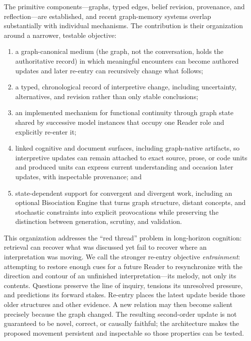 The primitive components---graphs, typed edges, belief revision, provenance, and reflection---are established, and recent graph-memory systems overlap substantially with individual mechanisms. The contribution is their organization around a narrower, testable objective:
\begin{enumerate}[leftmargin=*,nosep]
    \item a graph-canonical medium (the graph, not the conversation, holds the authoritative record) in which meaningful encounters can become authored updates and later re-entry can recursively change what follows;
    \item a typed, chronological record of interpretive change, including uncertainty, alternatives, and revision rather than only stable conclusions;
    \item an implemented mechanism for functional continuity through graph state shared by successive model instances that occupy one Reader role and explicitly re-enter it;
    \item linked cognitive and document surfaces, including graph-native artifacts, so interpretive updates can remain attached to exact source, prose, or code units and produced units can express current understanding and occasion later updates, with inspectable provenance; and
    \item state-dependent support for convergent and divergent work, including an optional Bisociation Engine that turns graph structure, distant concepts, and stochastic constraints into explicit provocations while preserving the distinction between generation, scrutiny, and validation.
\end{enumerate}

This organization addresses the ``red thread'' problem in long-horizon cognition: retrieval can recover what was discussed yet fail to recover where an interpretation was moving. We call the stronger re-entry objective \emph{entrainment}: attempting to restore enough cues for a future Reader to resynchronize with the direction and contour of an unfinished interpretation---its melody, not only its contents. Questions preserve the line of inquiry, tensions its unresolved pressure, and predictions its forward stakes. Re-entry places the latest update beside those older structures and other evidence. A new relation may then become salient precisely because the graph changed. The resulting second-order update is not guaranteed to be novel, correct, or causally faithful; the architecture makes the proposed movement persistent and inspectable so those properties can be tested.

